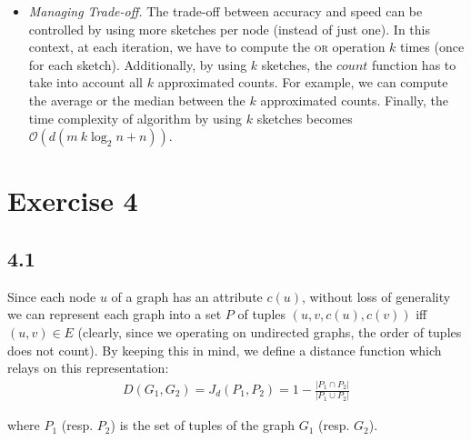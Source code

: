 \documentclass[12pt,a4paper]{article}
\begin{document}
\begin{description}
\begin{itemize}
\item \textit{Managing Trade-off.} The trade-off between accuracy and speed can be controlled by using more sketches per node (instead of just one). In this context, at each iteration, we have to compute the \textsc{or} operation $k$ times (once for each sketch). Additionally, by using $k$ sketches, the $count$ function has to take into account all $k$ approximated counts. For example, we can compute the average or the median between the $k$ approximated counts. Finally, the time complexity of algorithm by using $k$ sketches becomes $\mathcal{O}(d(m\ k \log_2 n + n))$.

\end{itemize}

 
\end{description}
 
\newpage




\section*{Exercise 4}

\subsection*{4.1}

Since each node $u$ of a graph has an attribute $c(u)$, without loss of generality we can represent each graph into a set $P$ of tuples $(u, v, c(u), c(v))$  iff $(u, v) \in E$ (clearly, since we operating on undirected graphs, the order of tuples does not count). By keeping this in mind, we define a distance function which relays on this representation:
\begin{align}\label{al:jacc}
D(G_1, G_2) = J_d(P_1, P_2) = 1 - \frac{|P_1 \cap P_2|}{|P_1 \cup P_2|}
\end{align}

where $P_1$ (resp. $P_2$) is the set of tuples of the graph $G_1$ (resp. $G_2$).
\end{document}
